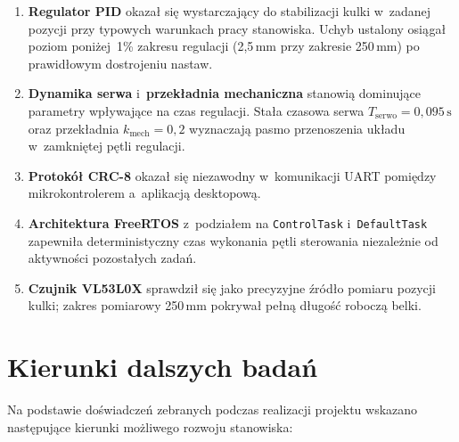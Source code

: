 \begin{enumerate}
  \item \textbf{Regulator PID} okazał się wystarczający do stabilizacji kulki
        w~zadanej pozycji przy typowych warunkach pracy stanowiska.
        Uchyb ustalony osiągał poziom poniżej~1\% zakresu regulacji (2{,}5\,mm
        przy zakresie 250\,mm) po prawidłowym dostrojeniu nastaw.

  \item \textbf{Dynamika serwa} i~\textbf{przekładnia mechaniczna} stanowią
        dominujące parametry wpływające na czas regulacji.
        Stała czasowa serwa $T_{\mathrm{serwo}} = 0{,}095\,\mathrm{s}$
        oraz przekładnia $k_{\mathrm{mech}} = 0{,}2$ wyznaczają
        pasmo przenoszenia układu w~zamkniętej pętli regulacji.

  \item \textbf{Protokół CRC-8} okazał się niezawodny w~komunikacji
        UART pomiędzy mikrokontrolerem a~aplikacją desktopową.

  \item \textbf{Architektura FreeRTOS} z~podziałem na \texttt{ControlTask}
        i~\texttt{DefaultTask} zapewniła deterministyczny czas wykonania
        pętli sterowania niezależnie od aktywności pozostałych zadań.

  \item \textbf{Czujnik VL53L0X} sprawdził się jako precyzyjne źródło
        pomiaru pozycji kulki; zakres pomiarowy 250\,mm pokrywał pełną
        długość roboczą belki.
\end{enumerate}

\section{Kierunki dalszych badań}

Na podstawie doświadczeń zebranych podczas realizacji projektu wskazano
następujące kierunki możliwego rozwoju stanowiska:

